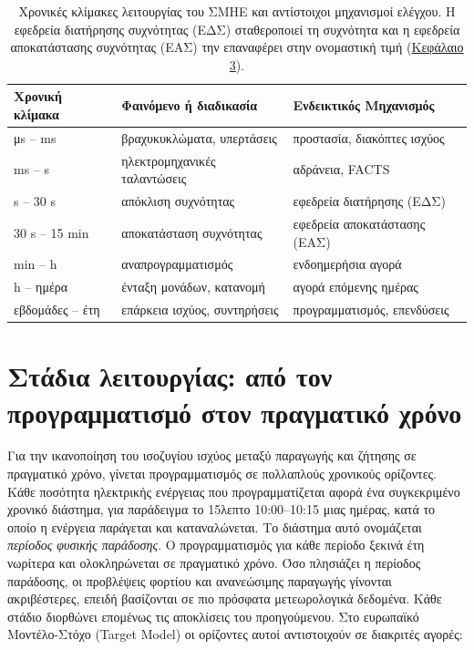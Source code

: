 \begin{table}[!htbp]
\centering
\begin{tabular}{lll}
\hline
Χρονική κλίμακα & Φαινόμενο ή διαδικασία & Ενδεικτικός Μηχανισμός \\
\hline
μs -- ms   & βραχυκυκλώματα, υπερτάσεις   & προστασία, διακόπτες ισχύος \\
ms -- s    & ηλεκτρομηχανικές ταλαντώσεις & αδράνεια, FACTS \\
s -- 30 s  & απόκλιση συχνότητας          & εφεδρεία διατήρησης (ΕΔΣ) \\
30 s -- 15 min & αποκατάσταση συχνότητας  & εφεδρεία αποκατάστασης (ΕΑΣ) \\
min -- h   & αναπρογραμματισμός           & ενδοημερήσια αγορά \\
h -- ημέρα & ένταξη μονάδων, κατανομή     & αγορά επόμενης ημέρας \\
εβδομάδες -- έτη & επάρκεια ισχύος, συντηρήσεις & προγραμματισμός, επενδύσεις \\
\hline
\end{tabular}
\caption{Χρονικές κλίμακες λειτουργίας του ΣΜΗΕ και αντίστοιχοι μηχανισμοί ελέγχου. Η εφεδρεία
διατήρησης συχνότητας (ΕΔΣ) σταθεροποιεί τη συχνότητα και η εφεδρεία αποκατάστασης συχνότητας
(ΕΑΣ) την επαναφέρει στην ονομαστική τιμή (\hyperref[kef-03-theoria]{Κεφάλαιο 3}).}
\label{tab:chronikes-klimakes}
\end{table}

\section{Στάδια λειτουργίας: από τον προγραμματισμό στον πραγματικό χρόνο}
\label{sec:stages}

Για την ικανοποίηση του ισοζυγίου ισχύος μεταξύ παραγωγής και ζήτησης σε πραγματικό χρόνο, γίνεται προγραμματισμός σε πολλαπλούς χρονικούς ορίζοντες. Κάθε ποσότητα ηλεκτρικής ενέργειας που προγραμματίζεται αφορά ένα συγκεκριμένο χρονικό
διάστημα, για παράδειγμα το 15λεπτο 10:00--10:15 μιας ημέρας, κατά το οποίο η ενέργεια παράγεται και καταναλώνεται. Το διάστημα αυτό ονομάζεται \emph{περίοδος φυσικής παράδοσης}. Ο προγραμματισμός για κάθε περίοδο ξεκινά έτη νωρίτερα και ολοκληρώνεται σε πραγματικό χρόνο. Όσο πλησιάζει η περίοδος παράδοσης, οι προβλέψεις φορτίου και ανανεώσιμης παραγωγής γίνονται ακριβέστερες, επειδή βασίζονται σε πιο πρόσφατα
μετεωρολογικά δεδομένα. Κάθε στάδιο διορθώνει επομένως τις αποκλίσεις του προηγούμενου. Στο ευρωπαϊκό
Μοντέλο-Στόχο (Target Model) οι ορίζοντες αυτοί αντιστοιχούν σε διακριτές αγορές:

